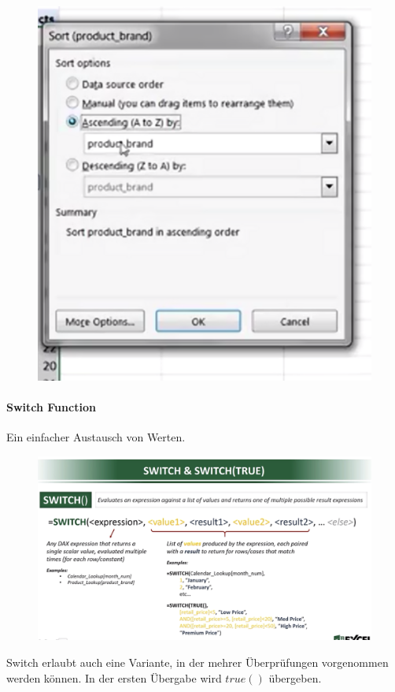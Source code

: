 \begin{figure}[H]
	\centering
	\includegraphics[scale = 0.3]{attachment/chapter_1/screenshot092}
	\caption{}
	\label{fig:screenshot092}
\end{figure} 
\paragraph{Switch Function}
Ein einfacher Austausch von Werten.
\begin{figure}[H]
	\centering
	\includegraphics[scale = 0.3]{attachment/chapter_1/screenshot094}
	\caption{}
	\label{fig:screenshot094}
\end{figure}
Switch erlaubt auch eine Variante, in der mehrer Überprüfungen vorgenommen werden können. In der ersten Übergabe wird $true()$ übergeben.
